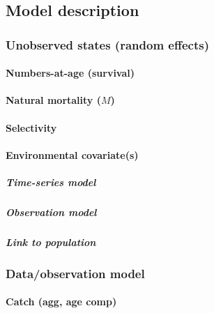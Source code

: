 \documentclass[]{article}
\let\oldparagraph\paragraph
\renewcommand{\paragraph}[1]{\oldparagraph{#1}\mbox{}}
\let\oldsubparagraph\subparagraph
\renewcommand{\subparagraph}[1]{\oldsubparagraph{#1}\mbox{}}
\begin{document}
\hypertarget{model-description}{%
\subsection{Model description}\label{model-description}}

\hypertarget{unobserved-states-random-effects}{%
\subsubsection{Unobserved states (random
effects)}\label{unobserved-states-random-effects}}

\hypertarget{numbers-at-age-survival}{%
\paragraph{Numbers-at-age (survival)}\label{numbers-at-age-survival}}

\hypertarget{natural-mortality-m}{%
\paragraph{\texorpdfstring{Natural mortality
(\(M\))}{Natural mortality (M)}}\label{natural-mortality-m}}

\hypertarget{selectivity}{%
\paragraph{Selectivity}\label{selectivity}}

\hypertarget{environmental-covariates}{%
\paragraph{Environmental covariate(s)}\label{environmental-covariates}}

\hypertarget{time-series-model}{%
\subparagraph{Time-series model}\label{time-series-model}}

\hypertarget{observation-model}{%
\subparagraph{Observation model}\label{observation-model}}

\hypertarget{link-to-population}{%
\subparagraph{Link to population}\label{link-to-population}}

\hypertarget{dataobservation-model}{%
\subsubsection{Data/observation model}\label{dataobservation-model}}

\hypertarget{catch-agg-age-comp}{%
\paragraph{Catch (agg, age comp)}\label{catch-agg-age-comp}}
\end{document}
